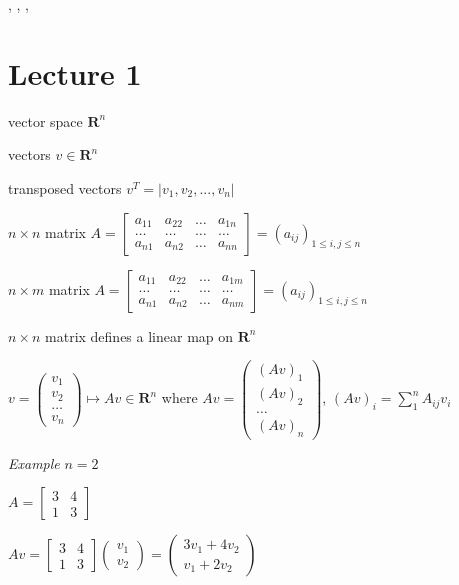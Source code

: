 \documentclass[
  12pt,
]{article}
\author{}
\date{}
\begin{document}
\newcommand{\bx}{\mathbf{x}},
\newcommand{\by}{\mathbf{y}},
\newcommand{\bz}{\mathbf{z}},
\newcommand{\ip}[2]{\left<#1, #2\right>}
\newcommand{\R}{\mathbb{R}}

\chapter{Lecture 1}\label{lecture-1}

vector space \(\mathbf{R}^n\)

vectors \(v\in \mathbf{R}^n\)

transposed vectors \(v^T=|v_1, v_2, ..., v_n|\)

\(n\times n\) matrix \(A = \begin{bmatrix} a_{11} & a_{22} & … & a_{1n} \\ … & … & … & … \\ a_{n1} & a_{n2} & … & a_{nn} \end{bmatrix} = (a_{ij})_{1\leq i,j \leq n}\)

\(n \times m\) matrix \(A = \begin{bmatrix} a_{11} & a_{22} & … & a_{1m} \\ … & … & … & … \\ a_{n1} & a_{n2} & … & a_{nm} \end{bmatrix} = (a_{ij})_{1\leq i,j \leq n}\)

\(n\times n\) matrix defines a linear map on \(\mathbf{R}^n\)

\(v = \begin{pmatrix} v_1 \\ v_2 \\ … \\ v_n\end{pmatrix} \mapsto Av \in \mathbf{R}^n\) where \(Av = \begin{pmatrix} (Av)_1 \\ (Av)_2 \\ … \\ (Av)_n \end{pmatrix}\), \((Av)_i = \sum^n_{1} A_{ij}v_i\)

\emph{Example} \(n = 2\)

\(A = \begin{bmatrix} 3 & 4 \\ 1 & 3 \end{bmatrix}\)

\(Av = \begin{bmatrix} 3 & 4 \\ 1 & 3\end{bmatrix} \begin{pmatrix} v_1 \\ v_2 \end{pmatrix} = \begin{pmatrix} 3v_1 + 4v_2 \\ v_1 + 2v_2 \end{pmatrix}\)
\end{document}
